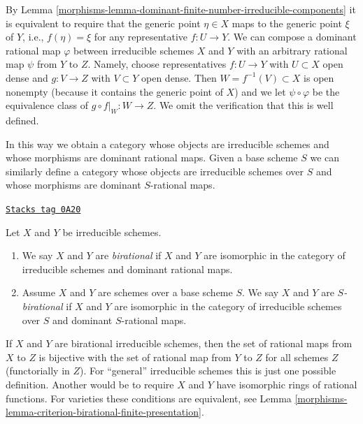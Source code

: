 By Lemma \ref{morphisms-lemma-dominant-finite-number-irreducible-components}
it is equivalent to require that the generic point $\eta \in X$
maps to the generic point $\xi$ of $Y$, i.e., $f(\eta) = \xi$ for
any representative $f : U \to Y$. We can compose a dominant rational map
$\varphi$ between irreducible schemes $X$ and $Y$ with an arbitrary rational
map $\psi$ from $Y$ to $Z$. Namely, choose
representatives $f : U \to Y$ with $U \subset X$ open dense
and $g : V \to Z$ with $V \subset Y$ open dense. Then
$W = f^{-1}(V) \subset X$ is open nonempty (because it contains the
generic point of $X$) and we let $\psi \circ \varphi$ be the
equivalence class of $g \circ f|_W : W \to Z$. We omit the verification
that this is well defined.

\medskip\noindent
In this way we obtain a category whose objects are irreducible schemes
and whose morphisms are dominant rational maps. Given a base scheme
$S$ we can similarly define a category whose objects are irreducible schemes
over $S$ and whose morphisms are dominant $S$-rational maps.

\begin{definition}
\label{morphisms-definition-birational-schemes}
\href{https://stacks.math.columbia.edu/tag/0A20}{\texttt{Stacks tag 0A20}}

Let $X$ and $Y$ be irreducible schemes.
\begin{enumerate}
\item We say $X$ and $Y$ are {\it birational} if $X$ and $Y$ are isomorphic
in the category of irreducible schemes and dominant rational maps.
\item Assume $X$ and $Y$ are schemes over a base scheme $S$.
We say $X$ and $Y$ are {\it $S$-birational} if $X$ and $Y$ are
isomorphic in the category of irreducible schemes over $S$ and
dominant $S$-rational maps.
\end{enumerate}
\end{definition}

If $X$ and $Y$ are birational irreducible schemes, then the set of rational
maps from $X$ to $Z$ is bijective with the set of rational map from $Y$ to $Z$
for all schemes $Z$ (functorially in $Z$). For ``general'' irreducible schemes
this is just one possible definition. Another would be
to require $X$ and $Y$ have isomorphic rings of rational functions. For
varieties these conditions are equivalent, see
Lemma \ref{morphisms-lemma-criterion-birational-finite-presentation}.

